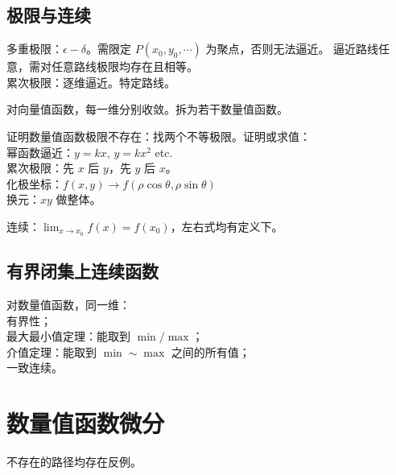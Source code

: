 \documentclass[12pt, a4paper, UTF8, openany]{ctexbook}
\begin{document}
        \subsection{极限与连续}
        多重极限：$\epsilon-\delta$。需限定 $P(x_0, y_0, \cdots)$ 为聚点，否则无法逼近。
        {\heiti 逼近路线任意}，需对任意路线极限均存在且相等。\\
        累次极限：逐维逼近。特定路线。

        对向量值函数，每一维分别收敛。拆为若干数量值函数。

        证明数量值函数极限不存在：找两个不等极限。证明或求值：\\
        幂函数逼近：$y = kx$, $y = kx^2$ etc. \\
        累次极限：先 $x$ 后 $y$，先 $y$ 后 $x$。\\
        化极坐标：$f(x, y) \to f(\rho\cos\theta, \rho\sin\theta)$ \\
        换元：$xy$ 做整体。

        连续：$\lim_{x \to x_0} f(x) = f(x_0)$，左右式均有定义下。

        \subsection{有界闭集上连续函数}
        对数量值函数，同一维：\\
        有界性；\\
        最大最小值定理：能取到 $\min / \max$；\\
        介值定理：能取到 $\min \sim \max$ 之间的所有值；\\
        一致连续。

    \section{数量值函数微分}
        不存在的路径均存在反例。

\end{document}
